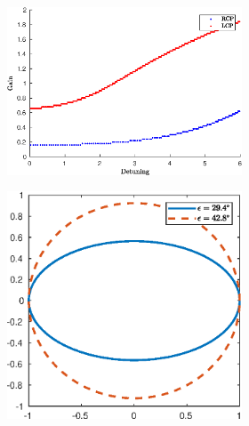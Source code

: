 \begin{figure}
	\centering
	\begin{subfigure}{.49\linewidth}
		\begin{subfigure}{\linewidth}
			\includegraphics[width=\linewidth]{plots/hybrid_defect/tuning}
			\caption{}
			\label{fig:hybrid_defect:tuning}
		\end{subfigure}
		\begin{subfigure}{\linewidth}
			\includegraphics[width=\linewidth]{plots/hybrid_defect/ellipses}
			\caption{}

\end{subfigure}
\end{subfigure}
\end{figure}
